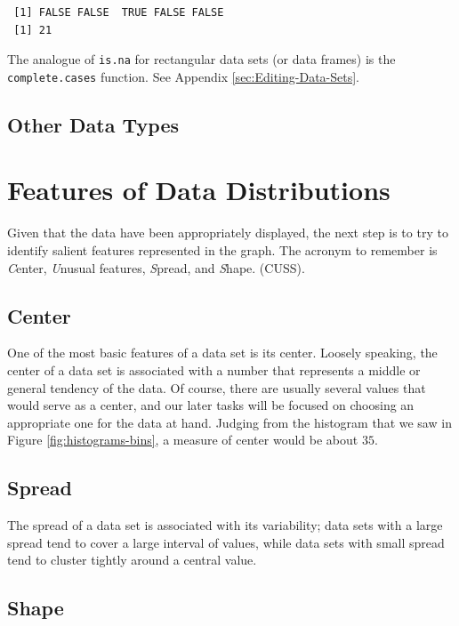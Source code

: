 \documentclass[captions=tableheading]{scrbook}
\begin{document}
\begin{verbatim}
 [1] FALSE FALSE  TRUE FALSE FALSE
 [1] 21
\end{verbatim}

The analogue of \texttt{is.na} for rectangular data sets (or data frames) is the \texttt{complete.cases} function. See Appendix \ref{sec:Editing-Data-Sets}.
\subsection{Other Data Types}
\label{sec-3-1-7}

\label{sub:other-data-types}
\section{Features of Data Distributions}
\label{sec-3-2}

\label{sec:features-of-data}

Given that the data have been appropriately displayed, the next step is to try to identify salient features represented in the graph. The acronym to remember is \emph{C}enter, \emph{U}nusual features, \emph{S}pread, and \emph{S}hape. (CUSS).
\subsection{Center}
\label{sec-3-2-1}

\label{sub:Center}

One of the most basic features of a data set is its center. Loosely speaking, the center of a data set is associated with a number that represents a middle or general tendency of the data. Of course, there are usually several values that would serve as a center, and our later tasks will be focused on choosing an appropriate one for the data at hand. Judging from the histogram that we saw in Figure \ref{fig:histograms-bins}, a measure of center would be about \(  35 \). 
\subsection{Spread}
\label{sec-3-2-2}

\label{sub:Spread}

The spread of a data set is associated with its variability; data sets with a large spread tend to cover a large interval of values, while data sets with small spread tend to cluster tightly around a central value. 
\subsection{Shape}
\label{sec-3-2-3}
\end{document}
